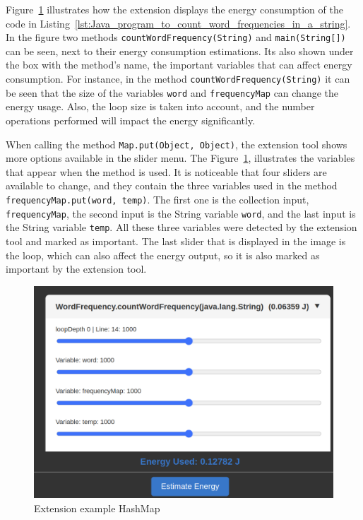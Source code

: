 Figure~\ref{fig:extension_example1} illustrates how the extension displays the energy consumption of the code in Listing~\ref{lst:Java_program_to_count_word_frequencies_in_a_string}. In the figure two methods \texttt{countWordFrequency(String)} and \texttt{main(String[])} can be seen, next to their energy consumption estimations. Its also shown under the box with the method's name, the important variables that can affect energy consumption. For instance, in the method \texttt{countWordFrequency(String)} it can be seen that the size of the variables \texttt{word} and \texttt{frequencyMap} can change the energy usage. Also, the loop size is taken into account, and the number operations performed will impact the energy significantly.

{\color{blue}When calling the method \texttt{Map.put(Object, Object)}, the extension tool shows more options available in the slider menu. The Figure~\ref{fig:extension_example1}, illustrates the variables that appear when the method is used. It is noticeable that four sliders are available to change, and they contain the three variables used in the method \texttt{frequencyMap.put(word, temp)}. The first one is the collection input, \texttt{frequencyMap}, the second input is the String variable \texttt{word}, and the last input is the String variable \texttt{temp}. All these three variables were detected by the extension tool and marked as important. The last slider that is displayed in the image is the loop, which can also affect the energy output, so it is also marked as important by the extension tool.}



\begin{figure}[htbp]
  \centering
  \includegraphics[width = .7 \textwidth]{figures/extension_example1.png}
  \caption{Extension example HashMap}
  \label{fig:extension_example1}
\end{figure}


